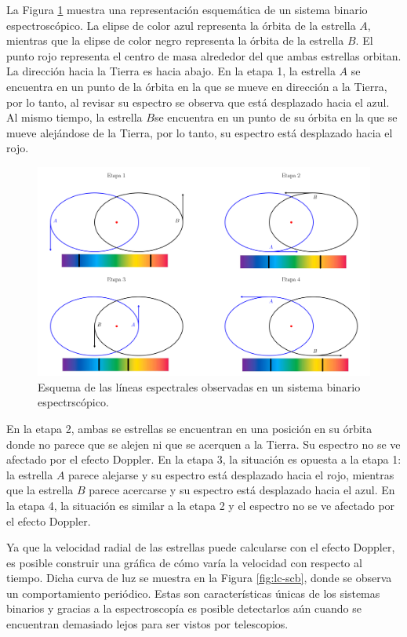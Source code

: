 La Figura \ref{fig:spectroscopic-binary} muestra una representación esquemática de un sistema binario espectroscópico. La elipse de color azul representa la órbita de la estrella $A$, mientras que la elipse de color negro representa la órbita de la estrella $B$. El punto rojo representa el centro de masa alrededor del que ambas estrellas orbitan. La dirección hacia la Tierra es hacia abajo. En la etapa 1, la estrella $A$ se encuentra en un punto de la órbita en la que se mueve en dirección a la Tierra, por lo tanto, al revisar su espectro se observa que está desplazado hacia el azul. Al mismo tiempo, la estrella $B$​​ se encuentra en un punto de su órbita en la que se mueve alejándose de la Tierra, por lo tanto, su espectro está desplazado hacia el rojo.

\begin{figure}[htb]
  \centering
				\includegraphics[width=\textwidth]{figures/Orbits-binary.png}
				\caption{Esquema de las líneas espectrales observadas en un sistema binario espectrscópico.}
				\label{fig:spectroscopic-binary} 
\end{figure}

En la etapa 2, ambas se estrellas se encuentran en una posición en su órbita donde no parece que se alejen ni que se acerquen a la Tierra. Su espectro no se ve afectado por el efecto Doppler. En la etapa 3, la situación es opuesta a la etapa 1: la estrella $A$ parece alejarse y su espectro está desplazado hacia el rojo, mientras que la estrella $B$ parece acercarse y su espectro está desplazado hacia el azul. En la etapa 4, la situación es similar a la etapa 2 y el espectro no se ve afectado por el efecto Doppler.

Ya que la velocidad radial de las estrellas puede calcularse con el efecto Doppler, es posible construir una gráfica de cómo varía la velocidad con respecto al tiempo. Dicha curva de luz se muestra en la Figura \ref{fig:lc-scb}, donde se observa un comportamiento periódico. Estas son características únicas de los sistemas binarios y gracias a la espectroscopía es posible detectarlos aún cuando se encuentran demasiado lejos para ser vistos por telescopios.

